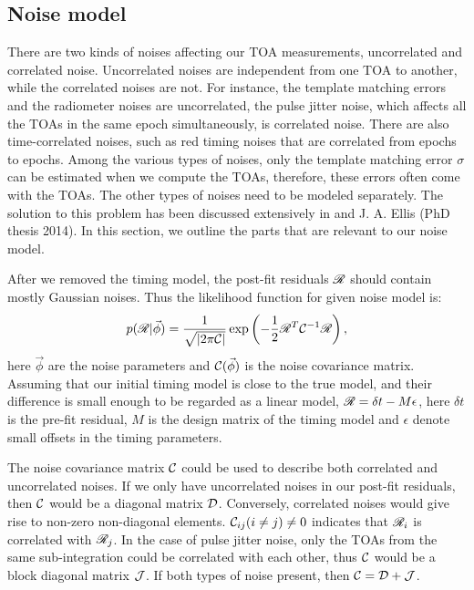\subsection{Noise model}
\label{sec:noise}
{\bfref 
There are two kinds of noises affecting our TOA measurements, uncorrelated
and correlated noise. Uncorrelated noises are 
independent from one TOA to another, while the correlated noises are not. 
For instance, the template matching errors and the radiometer noises are 
uncorrelated, the pulse jitter noise, which affects all the TOAs 
in the same epoch simultaneously, is correlated noise.
There are also time-correlated noises, such as red timing noises that are
correlated from epochs to epochs. Among the various types of noises, only the
template matching error $\sigma$ can be estimated when we compute the TOAs, therefore,
these errors often come with the TOAs. The other types of noises need to be modeled
separately.
The solution to this problem has been discussed extensively in \citet{vl13,
ell13, vv14a, vv14, abb+14} and J. A. Ellis (PhD thesis 2014). In this section, we outline the parts that are relevant to our noise model.


After we removed the timing model, the post-fit 
residuals $\mathscr{R}$ should contain mostly Gaussian noises. Thus the 
likelihood function for given noise model is:
\begin{equation}
\label{eq:bigC}
p(\mathscr{R}|\vec \phi) = \frac{1}{\sqrt{|2 \pi \mathcal{C}|}}
\exp\left(-\frac{1}{2}\mathscr{R}^T \mathcal{C}^{-1} \mathscr{R} \right),
\end{equation}
here $\vec \phi$ are the noise parameters and $\mathcal{C}(\vec \phi)$ is the noise
covariance matrix. 
Assuming that our initial timing model is close to the true model, and their
difference is small enough to be regarded as a linear model, $\mathscr{R}=\delta t
 - M \epsilon$, here $\delta t$ is the pre-fit residual,
$M$ is the design matrix of the timing model and $\epsilon$ denote small
offsets in the timing parameters. 

The noise covariance matrix $\mathcal{C}$ could be used to describe both
correlated and uncorrelated noises. If we only have uncorrelated noises in our
post-fit residuals, then $\mathcal{C}$ would be a diagonal matrix $\mathcal{D}$. Conversely, correlated
noises would give rise to non-zero non-diagonal elements. $\mathcal{C}_{ij}(i\neq
j)\neq 0$ indicates that $\mathscr{R}_{i}$ is correlated with $\mathscr{R}_{j}$. In the case
of pulse jitter noise, only the TOAs from the same sub-integration could be correlated
with each other, thus $\mathcal{C}$ would be a block diagonal matrix $\mathcal{J}$. If both types
of noise present, then $\mathcal{C} = \mathcal{D} + \mathcal{J}$.

}
